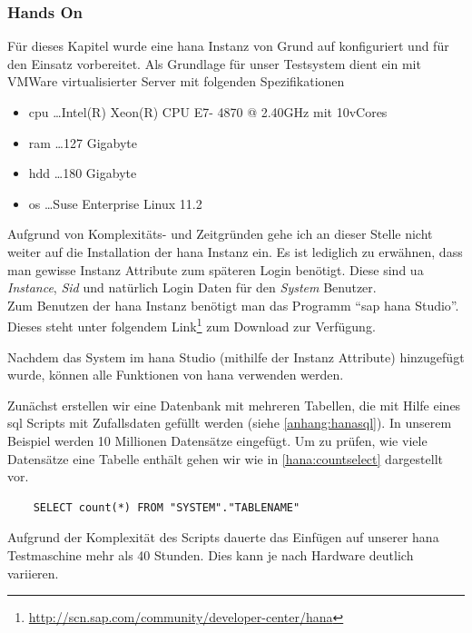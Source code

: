 \subsubsection{Hands On}
\label{sec:db-hana-ho}
Für dieses Kapitel wurde eine \gls{hana} Instanz von Grund auf konfiguriert und für den Einsatz vorbereitet. 
Als Grundlage für unser Testsystem dient ein mit VMWare virtualisierter Server mit folgenden Spezifikationen
\begin{itemize}
	\item \gls{cpu} \ldots Intel(R) Xeon(R) CPU E7- 4870  @ 2.40GHz mit 10vCores
	\item \gls{ram} \ldots 127 Gigabyte
	\item \gls{hdd} \ldots 180 Gigabyte
	\item \gls{os} \ldots Suse Enterprise Linux 11.2	
\end{itemize}

Aufgrund von Komplexitäts- und Zeitgründen gehe ich an dieser Stelle nicht weiter auf die Installation der \gls{hana} Instanz ein. Es ist lediglich zu erwähnen, dass man gewisse Instanz Attribute zum späteren Login benötigt. Diese sind \gls{ua} \emph{Instance}, \emph{Sid} und natürlich Login Daten für den \emph{System} Benutzer.\\
Zum Benutzen der \gls{hana} Instanz benötigt man das Programm "`\gls{sap} \gls{hana} Studio"'. Dieses steht unter folgendem Link\footnote{\url{http://scn.sap.com/community/developer-center/hana}} zum Download zur Verfügung.

Nachdem das System im \gls{hana} Studio (mithilfe der Instanz Attribute) hinzugefügt wurde, können alle Funktionen von \gls{hana} verwenden werden.

Zunächst erstellen wir eine Datenbank mit mehreren Tabellen, die mit Hilfe eines \gls{sql} Scripts mit Zufallsdaten gefüllt werden (siehe \ref{anhang:hanasql}). In unserem Beispiel werden 10 Millionen Datensätze eingefügt. Um zu prüfen, wie viele Datensätze eine Tabelle enthält gehen wir wie in \ref{hana:countselect} dargestellt vor.

\begin{lstlisting}
	SELECT count(*) FROM "SYSTEM"."TABLENAME"
\end{lstlisting}

Aufgrund der Komplexität des Scripts dauerte das Einfügen auf unserer \gls{hana} Testmaschine mehr als 40 Stunden. Dies kann je nach Hardware deutlich variieren.\\

